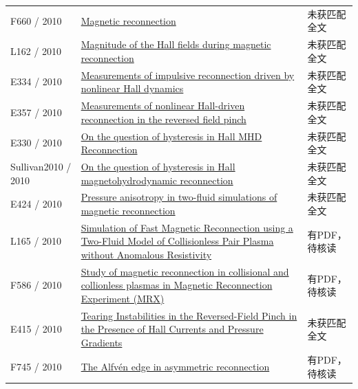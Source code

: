 \begin{longtable}{P{24mm}P{97mm}P{27mm}}
F660 / 2010 & \href{https://doi.org/10.1103/revmodphys.82.603}{Magnetic reconnection} & 未获匹配全文\\

L162 / 2010 & \href{https://doi.org/10.1029/2009gl041941}{Magnitude of the Hall fields during magnetic reconnection} & 未获匹配全文\\

E334 / 2010 & \href{https://doi.org/10.1063/1.3521336}{Measurements of impulsive reconnection driven by nonlinear Hall dynamics} & 未获匹配全文\\

E357 / 2010 & \href{http://absimage.aps.org/image/DPP10/MWS_DPP10-2010-000419.pdf}{Measurements of nonlinear Hall-driven reconnection in the reversed field pinch} & 未获匹配全文\\

E330 / 2010 & \href{http://absimage.aps.org/image/DPP10/MWS_DPP10-2010-001121.pdf}{On the question of hysteresis in Hall MHD Reconnection} & 未获匹配全文\\

Sullivan2010 / 2010 & \href{https://doi.org/10.1063/1.3518752}{On the question of hysteresis in Hall magnetohydrodynamic reconnection} & 未获匹配全文\\

E424 / 2010 & \href{https://ui.adsabs.harvard.edu/abs/2010APS..DPPCP9139J/abstract}{Pressure anisotropy in two-fluid simulations of magnetic reconnection} & 未获匹配全文\\

L165 / 2010 & \href{https://doi.org/10.48550/arxiv.1010.0222}{Simulation of Fast Magnetic Reconnection using a Two-Fluid Model of Collisionless Pair Plasma without Anomalous Resistivity} & 有PDF，待核读\\

F586 / 2010 & \href{https://doi.org/10.1017/s1743921311006508}{Study of magnetic reconnection in collisional and collionless plasmas in Magnetic Reconnection Experiment (MRX)} & 有PDF，待核读\\

E415 / 2010 & \href{http://absimage.aps.org/image/DPP10/MWS_DPP10-2010-001620.pdf}{Tearing Instabilities in the Reversed-Field Pinch in the Presence of Hall Currents and Pressure Gradients} & 未获匹配全文\\

F745 / 2010 & \href{https://doi.org/10.5194/angeo-28-1327-2010}{The Alfvén edge in asymmetric reconnection} & 有PDF，待核读\\


\end{longtable}
